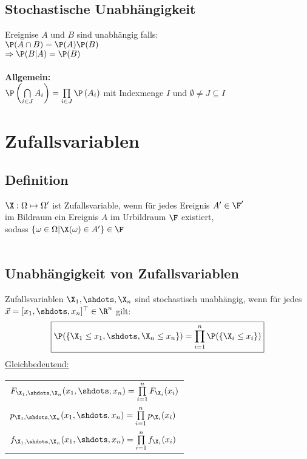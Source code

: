 \documentclass[german,color,6pt]{latex4ei/latex4ei_sheet}
\begin{document}
\begin{sectionbox}
	\subsection{Stochastische Unabhängigkeit}
	Ereignise $A$ und $B$ sind unabhängig falls:\\
	$\P(A \cap B) = \P(A)\P(B)$ \\
	$\Rightarrow \P(B|A)=\P(B)$  \\ \\
	\textbf{Allgemein:}  \\ 
	$\P\left(\bigcap\limits_{i \in J} A_i\right) = \prod\limits_{i \in J}\P\left(A_i\right)$
	mit Indexmenge $I$ und $\emptyset \neq J \subseteq I$
\end{sectionbox}	


\section{Zufallsvariablen}
\begin{sectionbox}
	\subsection{Definition}
	$\X : \Omega \mapsto \Omega'$ ist Zufallsvariable, wenn für jedes Ereignis $A' \in \F'$  \\ 
	im Bildraum ein Ereignis $A$ im Urbildraum $\F$ existiert, \\ 
	sodass $\left\{\omega \in \Omega|\X(\omega) \in A'\right\} \in \F$\\ \\ 
\end{sectionbox}

\begin{sectionbox}
	\subsection{Unabhängigkeit von Zufallsvariablen}
	Zufallsvariablen $\X_1,\shdots,\X_n$ sind stochastisch unabhängig, wenn für jedes $\vec{x} = [x_1,\shdots,x_n]^\top \in \R^n$ gilt:
	\[\boxed{\P(\{\X_1 \leq x_1,\shdots,\X_n \leq x_n\}) = \prod\limits_{i=1}^{n}{\P(\{\X_i \leq x_i\})}}\]
	\underline{Gleichbedeutend:}\\
	\begin{tabular}{l}
		$F_{\X_1,\shdots,\X_n}(x_1,\shdots,x_n) = \prod\limits_{i=1}^{n}{F_{\X_i}(x_i)}$\\
		$p_{\X_1,\shdots,\X_n}(x_1,\shdots,x_n) = \prod\limits_{i=1}^{n}{p_{\X_i}(x_i)}$\\
		$f_{\X_1,\shdots,\X_n}(x_1,\shdots,x_n) = \prod\limits_{i=1}^{n}{f_{\X_i}(x_i)}$\\
	\end{tabular}
\end{sectionbox}
\end{document}
